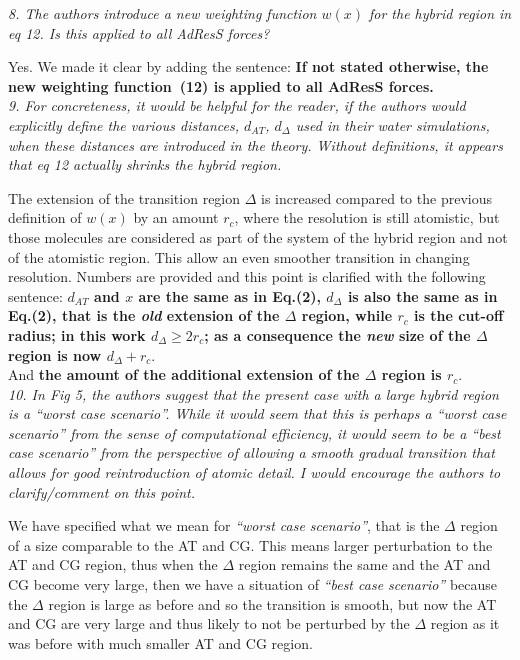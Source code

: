 \documentclass[a4paper]{article}
\begin{document}
\textit{
8. The authors introduce a new weighting function $w(x)$ for the hybrid
region in eq 12. Is this applied to all AdResS forces?
}

Yes. We made it clear by adding the sentence: {\bf If not stated otherwise, the new weighting function~(12)
  is applied to all AdResS forces.}
\\

\textit{
9. For concreteness, it would be helpful for the reader, if the
authors would explicitly define the various distances, $d_{{AT}}$, $d_{\Delta}$
used in their water simulations, when these distances are introduced
in the theory. Without definitions, it appears that eq 12 actually
shrinks the hybrid region.
}

The extension of the transition region $\Delta$ is increased compared to the previous definition of $w(x)$ by an amount $r_{c}$, where the resolution is still atomistic, but those molecules are considered as part of the system of the hybrid region and not of the atomistic region. This allow an even smoother transition in changing resolution.
Numbers are provided and this point is clarified with the following sentence:
{\bf $d_{AT}$ and $x$ are the same as in  Eq.(2), $d_{{\Delta}}$ is also the same as in Eq.(2), that is the {\it old} extension of the $\Delta$ region, while $r_c$ is the cut-off
radius; in this work $d_{{\Delta}} \geq 2r_c$; as a consequence the {\it new} size of the $\Delta$ region is now $d_{{\Delta}}+r_c$}.\\
And {\bf the amount of the additional extension of the $\Delta$ region is $r_{c}$}.
\\

\textit{
10.  In Fig 5, the authors suggest that the present case with a large
hybrid region is a {\it ``worst case scenario''}. While it would seem that
this is perhaps a {\it ``worst case scenario''} from the sense of
computational efficiency, it would seem to be a ``best case scenario''
from the perspective of allowing a smooth gradual transition that
allows for good reintroduction of atomic detail. I would encourage the
authors to clarify/comment on this point.
}

We have specified what we mean for {\it ``worst case scenario''}, that is the $\Delta$ region of a size comparable to the AT and CG. This means larger perturbation to the AT and CG region, thus when the $\Delta$ region remains the same and the AT and CG become very large, then we have a situation of {\it ``best case scenario''} because the $\Delta$ region is large as before and so the transition is smooth, but now the AT and CG are very large and thus likely to not be perturbed by the $\Delta$ region as it was before with much smaller AT and CG region.
\\
\end{document}
